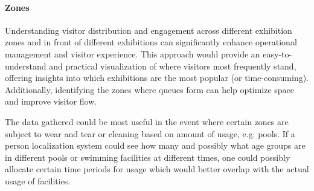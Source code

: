 \paragraph{Zones}
\label{sec:zones}
Understanding visitor distribution and engagement across different exhibition zones and in front of different exhibitions can significantly enhance operational management and visitor experience. This approach would provide an easy-to-understand and practical visualization of where visitors most frequently stand, offering insights into which exhibitions are the most popular (or time-consuming). Additionally, identifying the zones where queues form can help optimize space and improve visitor flow. 

The data gathered could be most useful in the event where certain zones are subject to wear and tear or cleaning based on amount of usage, e.g. pools. If a person localization system could see how many and possibly what age groups are in different pools or swimming facilities at different times, one could possibly allocate certain time periods for usage which would better overlap with the actual usage of facilities. 